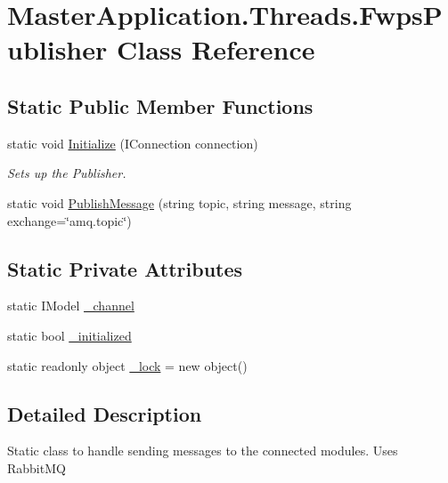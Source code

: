 \hypertarget{class_master_application_1_1_threads_1_1_fwps_publisher}{}\section{Master\+Application.\+Threads.\+Fwps\+Publisher Class Reference}
\label{class_master_application_1_1_threads_1_1_fwps_publisher}
\subsection*{Static Public Member Functions}
\begin{DoxyCompactItemize}
\item 
static void \mbox{\hyperlink{class_master_application_1_1_threads_1_1_fwps_publisher_adafe58736252f353111b720863e189eb}{Initialize}} (I\+Connection connection)
\begin{DoxyCompactList}\small\item\em Sets up the Publisher. \end{DoxyCompactList}\item 
static void \mbox{\hyperlink{class_master_application_1_1_threads_1_1_fwps_publisher_a45efdbdf9d1a8ab5e25556e209af87e3}{Publish\+Message}} (string topic, string message, string exchange=\char`\"{}amq.\+topic\char`\"{})
\end{DoxyCompactItemize}
\subsection*{Static Private Attributes}
\begin{DoxyCompactItemize}
\item 
static I\+Model \mbox{\hyperlink{class_master_application_1_1_threads_1_1_fwps_publisher_ac43fad545679e2527729a43a9810452f}{\+\_\+channel}}
\item 
static bool \mbox{\hyperlink{class_master_application_1_1_threads_1_1_fwps_publisher_ad8a2e4a36b9fbb88325500371e06ff50}{\+\_\+initialized}}
\item 
static readonly object \mbox{\hyperlink{class_master_application_1_1_threads_1_1_fwps_publisher_a90b87f7a5031791824049034892a4274}{\+\_\+lock}} = new object()
\end{DoxyCompactItemize}


\subsection{Detailed Description}
Static class to handle sending messages to the connected modules. Uses Rabbit\+MQ 

